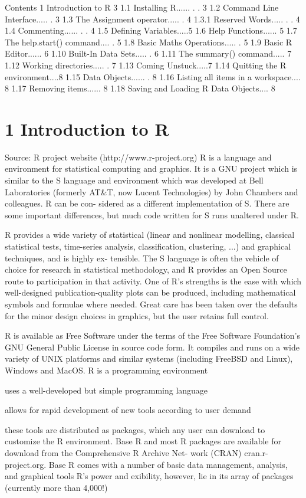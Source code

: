 Contents
1 Introduction to R 3
1.1 Installing R...... . . 3
1.2 Command Line Interface..... . 3
1.3 The Assignment operator..... . 4
1.3.1 Reserved Words..... . . 4
1.4 Commenting...... . . 4
1.5 Defining Variables.....5
1.6 Help Functions...... 5
1.7 The help.start() command.... . 5
1.8 Basic Maths Operations..... . 5
1.9 Basic R Editor...... 6
1.10 Built-In Data Sets..... . 6
1.11 The summary() command..... 7
1.12 Working directories..... . 7
1.13 Coming Unstuck.....7
1.14 Quitting the R environment....8
1.15 Data Objects...... . 8
1.16 Listing all items in a workspace.... 8
1.17 Removing items...... 8
1.18 Saving and Loading R Data Objects.... 8
\section{1 Introduction to R}
Source: R project website (http://www.r-project.org)
R is a language and environment for statistical computing and graphics. It is a GNU project
which is similar to the S language and environment which was developed at Bell Laboratories
(formerly AT&T, now Lucent Technologies) by John Chambers and colleagues. R can be con-
sidered as a different implementation of S. There are some important differences, but much
code written for S runs unaltered under R.

R provides a wide variety of statistical (linear and nonlinear modelling, classical statistical tests,
time-series analysis, classification, clustering, ...) and graphical techniques, and is highly ex-
tensible. The S language is often the vehicle of choice for research in statistical methodology,
and R provides an Open Source route to participation in that activity.
One of R's strengths is the ease with which well-designed publication-quality plots can be
produced, including mathematical symbols and formulae where needed. Great care has been
taken over the defaults for the minor design choices in graphics, but the user retains full control.

R is available as Free Software under the terms of the Free Software Foundation's GNU General
Public License in source code form. It compiles and runs on a wide variety of UNIX platforms
and similar systems (including FreeBSD and Linux), Windows and MacOS.
R is a programming environment
\item uses a well-developed but simple programming language
\item allows for rapid development of new tools according to user demand
\item these tools are distributed as packages, which any user can download to customize the R
environment.
Base R and most R packages are available for download from the Comprehensive R Archive Net-
work (CRAN) cran.r-project.org. Base R comes with a number of basic data management,
analysis, and graphical tools R's power and 
exibility, however, lie in its array of packages
(currently more than 4,000!)

